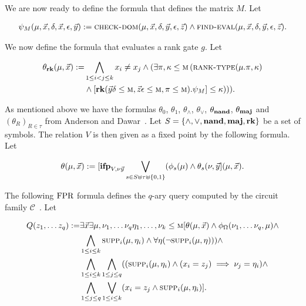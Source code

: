 \documentclass[../paper.tex]{subfiles}
\begin{document}
We are now ready to define the formula that defines the matrix $M$. Let
				
\begin{align*}
	\psi_M (\mu, \vec{x}, \delta, \vec{x}, \epsilon, \vec{y}) :=  \textsc{check-dom}(\mu, \vec{x}, \delta, \vec{y}, \epsilon, \vec{z}) \land \textsc{find-eval} (\mu, \vec{x}, \delta, \vec{y}, \epsilon, \vec{z}).
\end{align*}
				
We now define the formula that evaluates a rank gate $g$. Let
				
\begin{align*}
	\theta_{\text{\textbf{rk}}} (\mu, \vec{x}) := & \bigwedge_{1 \leq i < j \leq k} x_i \neq x_j \land (\exists \pi, \kappa \leq \textsc{m} \, (\textsc{rank-type}(\mu. \pi, \kappa) \\ &\land [\text{\textbf{rk}} (\vec{y}\delta\leq \textsc{m}, \vec{z}\epsilon\leq \textsc{m}, \pi \leq \textsc{m}). \psi_M] \leq \kappa ))).
\end{align*}
				
As mentioned above we have the formulas $\theta_0$, $\theta_1$, $\theta_\land$,
$\theta_\lor$, $\theta_{\text{\textbf{nand}}}$, $\theta_{\text{\textbf{maj}}}$ and $(\theta_R)_{R \in \tau}$ from
Anderson and Dawar~\cite{AndersonD17}. Let $S = \{\land, \lor, \text{\textbf{nand}}, \text{\textbf{maj}},
\text{\textbf{rk}}\}$ be a set of symbols. The relation $V$ is then given as a fixed point by
the following formula. Let

\begin{align*}
	\theta (\mu, \vec{x}) := [\text{\textbf{ifp}}_{V,\nu \vec{y}} \bigvee_{s \in  S \uplus \tau \uplus \{0,1\}} (\phi_s(\mu) \land \theta_s (\nu, \vec{y} ] (\mu, \vec{x}).
\end{align*}

The following $\text{\upshape FPR}$ formula defines the $q$-ary query computed by the circuit
family $\mathcal{C}$~\cite{AndersonD17}. Let
				
\begin{align*}
	Q (z_1, \ldots z_q) := & \exists \vec{x} \exists \mu, \nu_1 , \ldots  \nu_q \eta_1 , \ldots , \nu_k \leq \textsc{m} [\theta (\mu, \vec{x}) \land \phi_\Omega (\nu_1, \ldots \nu_q, \mu) \land \\
                         & \bigwedge_{1 \leq i \leq k} \textsc{supp}_i (\mu, \eta_i) \wedge \forall \eta (\neg \textsc{supp}_i (\mu, \eta))) \land \\
                         & \bigwedge_{1 \leq i \leq k} \bigwedge_{1 \leq j \leq q}((\textsc{supp}_i (\mu, \eta_i) \land (x_i = z_j) \implies \nu_j = \eta_i) \land \\ &
                                                                                                                                                                    \bigwedge_{1 \leq j \leq q} \bigvee_{1 \leq i \leq k} (x_i = z_j \land \textsc{supp}_i (\mu, \eta_i)].
\end{align*}
				
\end{document}

